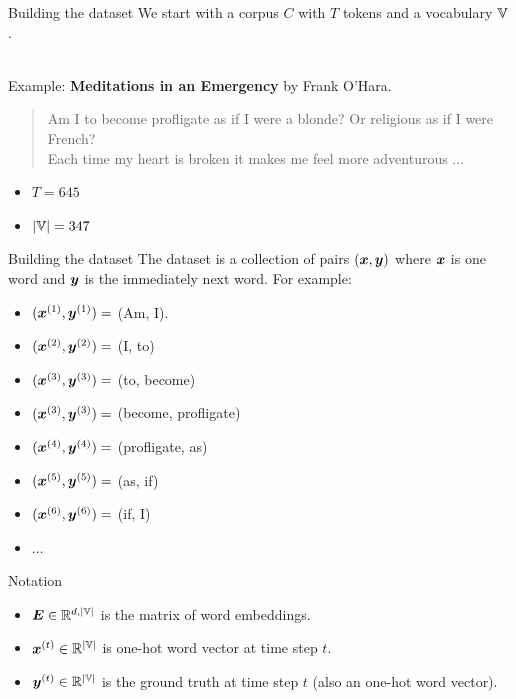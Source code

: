 \documentclass[10pt]{beamer}
\begin{document}
\begin{frame}{Building the dataset}
We start with a corpus $C$ with $T$ tokens and a vocabulary $\mathbb{V}$.\\\

Example: \textbf{Meditations in an Emergency} by Frank O'Hara.\\

\begin{quote}
\alert{Am I to become profligate as if I were a blonde? Or religious as if I were French?\\
Each time my heart is broken it makes me feel more adventurous ... \\}
\end{quote}

\begin{itemize}
\item $T = 645$
\item $|\mathbb{V}| = 347$
\end{itemize}

\end{frame}

\begin{frame}{Building the dataset}
The dataset is a collection of pairs $(\bm{x},\bm{y})$ where $\bm{x}$ is one word and $\bm{y}$ is the immediately next word. For example:
\begin{itemize}
\item [] $(\bm{x}^{(1)}, \bm{y}^{(1)}) =$ (Am, I).
\item [] $(\bm{x}^{(2)}, \bm{y}^{(2)}) =$ (I, to)
\item [] $(\bm{x}^{(3)}, \bm{y}^{(3)}) =$ (to, become)
\item [] $(\bm{x}^{(3)}, \bm{y}^{(3)}) =$ (become, profligate)
\item [] $(\bm{x}^{(4)}, \bm{y}^{(4)}) =$ (profligate, as)
\item [] $(\bm{x}^{(5)}, \bm{y}^{(5)}) =$ (as, if)
\item [] $(\bm{x}^{(6)}, \bm{y}^{(6)}) =$ (if, I)
\item [] $\dots$
\end{itemize}
\end{frame}

\begin{frame}{Notation}
\begin{itemize}
\item $\bm{E} \in \mathbb{R}^{d,|\mathbb{V}|}$ is the matrix of word embeddings.
\vspace{0.3cm}
\item $\bm{x}^{(t)} \in \mathbb{R}^{|\mathbb{V}|}$ is one-hot word vector at time step $t$.
\vspace{0.3cm}
\item $\bm{y}^{(t)} \in \mathbb{R}^{|\mathbb{V}|}$ is the ground truth at time step $t$ (also an one-hot word vector).
\end{itemize}
\end{frame}
\end{document}
